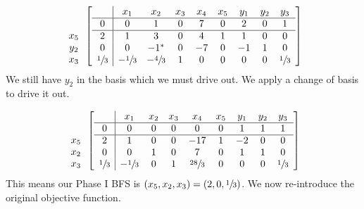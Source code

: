 \documentclass[12pt]{article}
\newenvironment{problem}[2][Problem]{\begin{trivlist}
\item[\hskip \labelsep {\bfseries #1}\hskip \labelsep {\bfseries #2.}]}{\end{trivlist}}
\theoremstyle{definition}
\begin{document}
\begin{problem}{4}
\begin{equation}
\begin{array}{c}
\\
  \\
x_5 \\
y_2 \\
x_3
\end{array}
\begin{bmatrix}
\begin{array}{c|cccccccc}
    & x_1 & x_2 & x_3 & x_4 & x_5 & y_1 & y_2 & y_3 \\ \hline
  0 & 0 & 1 & 0 & 7 & 0 & 2 & 0 & 1 \\ \hline
  2 & 1 & 3 & 0 & 4 & 1 & 1 & 0 & 0  \\
  0 & 0 & -1^* & 0 & -7 & 0 & -1 & 1 & 0  \\
  \sfrac{1}{3} & -\sfrac{1}{3} & -\sfrac{4}{3} & 1 & 0 & 0 & 0 & 0 & \sfrac{1}{3}  \\
\end{array}
\end{bmatrix}
\end{equation}
$ $ \\

We still have $y_2$ in the basis which we must drive out.
We apply a change of basis to drive it out.

\begin{equation}
\begin{array}{c}
\\
  \\
x_5 \\
x_2 \\
x_3
\end{array}
\begin{bmatrix}
\begin{array}{c|cccccccc}
    & x_1 & x_2 & x_3 & x_4 & x_5 & y_1 & y_2 & y_3 \\ \hline
  0 & 0 & 0 & 0 & 0 & 0 & 1 & 1 & 1 \\ \hline
  2 & 1 & 0 & 0 & -17 & 1 & -2 & 0 & 0  \\
  0 & 0 & 1 & 0 & 7 & 0 & 1 & 1 & 0  \\
  \sfrac{1}{3} & -\sfrac{1}{3} & 0 & 1 & \sfrac{28}{3} & 0 & 0 & 0 & \sfrac{1}{3}  \\
\end{array}
\end{bmatrix}
\end{equation}
$ $ \\

This means our Phase I BFS is $(x_5, x_2, x_3) = (2, 0, \sfrac{1}{3})$.
We now re-introduce the original objective function.


\end{problem}
\end{document}
